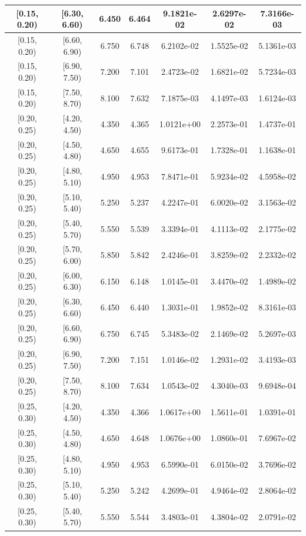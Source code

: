 \begin{longtable}{|c|c|c|c|c|c|c|}
\hline
[0.15, 0.20) & [6.30, 6.60) & 6.450 & 6.464 & 9.1821e-02 & 2.6297e-02 & 7.3166e-03 \\ 
\hline
[0.15, 0.20) & [6.60, 6.90) & 6.750 & 6.748 & 6.2102e-02 & 1.5525e-02 & 5.1361e-03 \\ 
\hline
[0.15, 0.20) & [6.90, 7.50) & 7.200 & 7.101 & 2.4723e-02 & 1.6821e-02 & 5.7234e-03 \\ 
\hline
[0.15, 0.20) & [7.50, 8.70) & 8.100 & 7.632 & 7.1875e-03 & 4.1497e-03 & 1.6124e-03 \\ 
\hline
[0.20, 0.25) & [4.20, 4.50) & 4.350 & 4.365 & 1.0121e+00 & 2.2573e-01 & 1.4737e-01 \\ 
\hline
[0.20, 0.25) & [4.50, 4.80) & 4.650 & 4.655 & 9.6173e-01 & 1.7328e-01 & 1.1638e-01 \\ 
\hline
[0.20, 0.25) & [4.80, 5.10) & 4.950 & 4.953 & 7.8471e-01 & 5.9234e-02 & 4.5958e-02 \\ 
\hline
[0.20, 0.25) & [5.10, 5.40) & 5.250 & 5.237 & 4.2247e-01 & 6.0020e-02 & 3.1563e-02 \\ 
\hline
[0.20, 0.25) & [5.40, 5.70) & 5.550 & 5.539 & 3.3394e-01 & 4.1113e-02 & 2.1775e-02 \\ 
\hline
[0.20, 0.25) & [5.70, 6.00) & 5.850 & 5.842 & 2.4246e-01 & 3.8259e-02 & 2.2332e-02 \\ 
\hline
[0.20, 0.25) & [6.00, 6.30) & 6.150 & 6.148 & 1.0145e-01 & 3.4470e-02 & 1.4989e-02 \\ 
\hline
[0.20, 0.25) & [6.30, 6.60) & 6.450 & 6.440 & 1.3031e-01 & 1.9852e-02 & 8.3161e-03 \\ 
\hline
[0.20, 0.25) & [6.60, 6.90) & 6.750 & 6.745 & 5.3483e-02 & 2.1469e-02 & 5.2697e-03 \\ 
\hline
[0.20, 0.25) & [6.90, 7.50) & 7.200 & 7.151 & 1.0146e-02 & 1.2931e-02 & 3.4193e-03 \\ 
\hline
[0.20, 0.25) & [7.50, 8.70) & 8.100 & 7.634 & 1.0543e-02 & 4.3040e-03 & 9.6948e-04 \\ 
\hline
[0.25, 0.30) & [4.20, 4.50) & 4.350 & 4.366 & 1.0617e+00 & 1.5611e-01 & 1.0391e-01 \\ 
\hline
[0.25, 0.30) & [4.50, 4.80) & 4.650 & 4.648 & 1.0676e+00 & 1.0860e-01 & 7.6967e-02 \\ 
\hline
[0.25, 0.30) & [4.80, 5.10) & 4.950 & 4.953 & 6.5990e-01 & 6.0150e-02 & 3.7696e-02 \\ 
\hline
[0.25, 0.30) & [5.10, 5.40) & 5.250 & 5.242 & 4.2699e-01 & 4.9464e-02 & 2.8064e-02 \\ 
\hline
[0.25, 0.30) & [5.40, 5.70) & 5.550 & 5.544 & 3.4803e-01 & 4.3804e-02 & 2.0791e-02 \\ 

\end{longtable}
